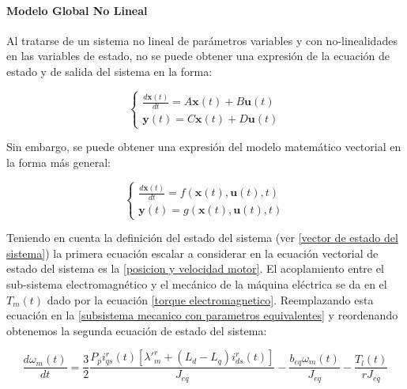 \documentclass[a4paper, 10pt, onecolumn,journal]{ieeeconf}
\begin{document}
\paragraph{\textbf{Modelo Global No Lineal}}
Al tratarse de un sistema no lineal de parámetros variables y con no-linealidades en las variables de estado, no se puede obtener una expresión
de la ecuación de estado y de salida del sistema en la forma:

\begin{equation*}
    \begin{cases}
        \frac{d \mathbf{x}(t)}{dt} = A \mathbf{x}(t) + B \mathbf{u}(t)\\
        \mathbf{y}(t) = C \mathbf{x}(t) + D \mathbf{u}(t)
    \end{cases}
\end{equation*}

Sin embargo, se puede obtener una expresión del modelo matemático vectorial en la forma más general:

\begin{equation*}
    \begin{cases}
        \frac{d \mathbf{x}(t)}{dt} = f(\mathbf{x}(t), \mathbf{u}(t), t)\\
        \mathbf{y}(t) = g(\mathbf{x}(t), \mathbf{u}(t), t)
    \end{cases}
\end{equation*}

Teniendo en cuenta la definición del estado del sistema (ver \cref{vector de estado del sistema}) la primera ecuación escalar a considerar en la ecuación vectorial de estado del sistema es la
\cref{posicion y velocidad motor}. El acoplamiento entre el sub-sistema electromagnético y el
mecánico de la máquina eléctrica se da en el $T_m(t)$ dado por la ecuación \cref{torque electromagnetico}.
Reemplazando esta ecuación en la \cref{subsistema mecanico con parametros equivalentes} y reordenando
obtenemos la segunda ecuación de estado del sistema:

\begin{equation}
    \frac{d \omega_m(t)}{dt} = \frac{3}{2} \frac{P_p i^r_{qs}(t)\left[\lambda'^r_m + (L_d - L_q) i^r_{ds}(t) \right]}{J_{eq}} - \frac{b_{eq}\omega_m(t)}{J_{eq}} - \frac{T_l(t)}{r J_{eq}}
    \label{ecuacion de estado wm}
\end{equation}
\end{document}
